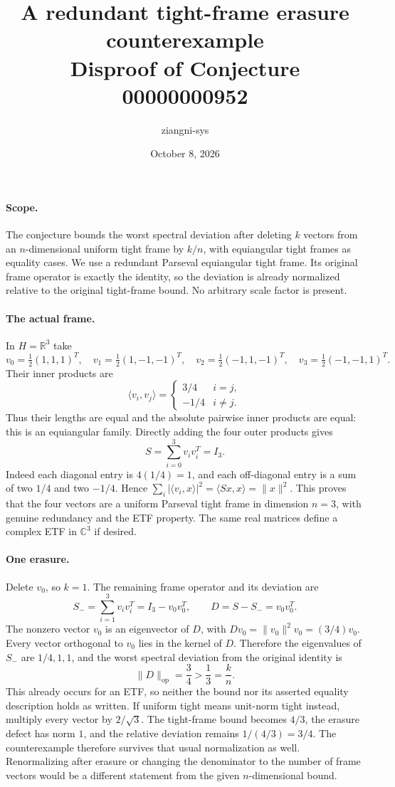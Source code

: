 \documentclass[11pt]{article}
\title{A redundant tight-frame erasure counterexample\\Disproof of Conjecture 00000000952}
\author{ziangni-sys}
\date{October 8, 2026}
\begin{document}
\maketitle
\paragraph{Scope.}
The conjecture bounds the worst spectral deviation after deleting $k$
vectors from an $n$-dimensional uniform tight frame by $k/n$, with
equiangular tight frames as equality cases. We use a redundant
Parseval equiangular tight frame. Its original frame operator is exactly
the identity, so the deviation is already normalized relative to the
original tight-frame bound. No arbitrary scale factor is present.

\paragraph{The actual frame.}
In $H=\mathbb R^3$ take
\[
 v_0=\tfrac12(1,1,1)^T,\quad
 v_1=\tfrac12(1,-1,-1)^T,\quad
 v_2=\tfrac12(-1,1,-1)^T,\quad
 v_3=\tfrac12(-1,-1,1)^T.
\]
Their inner products are
\[
 \langle v_i,v_j\rangle=
 \begin{cases}3/4&i=j,\\-1/4&i\ne j.\end{cases}
\]
Thus their lengths are equal and the absolute pairwise inner products
are equal: this is an equiangular family. Directly adding the four
outer products gives
\[
 S=\sum_{i=0}^3 v_i v_i^T=I_3.
\]
Indeed each diagonal entry is $4(1/4)=1$, and each off-diagonal entry
is a sum of two $1/4$ and two $-1/4$. Hence
$\sum_i|\langle v_i,x\rangle|^2=\langle Sx,x\rangle=\|x\|^2$.
This proves that the four vectors are a uniform Parseval tight frame
in dimension $n=3$, with genuine redundancy and the ETF property.
The same real matrices define a complex ETF in $\mathbb C^3$ if desired.

\paragraph{One erasure.}
Delete $v_0$, so $k=1$. The remaining frame operator and its deviation are
\[
 S_-=\sum_{i=1}^3v_iv_i^T=I_3-v_0v_0^T,
 \qquad D=S-S_-=v_0v_0^T.
\]
The nonzero vector $v_0$ is an eigenvector of $D$, with
$Dv_0=\|v_0\|^2v_0=(3/4)v_0$. Every vector orthogonal to $v_0$ lies
in the kernel of $D$. Therefore the eigenvalues of $S_-$ are
$1/4,1,1$, and the worst spectral deviation from the original
identity is
\[
 \|D\|_{\mathrm{op}}=\frac34>\frac13=\frac{k}{n}.
\]
This already occurs for an ETF, so neither the bound nor its asserted
equality description holds as written. If uniform tight means unit-norm
tight instead, multiply every vector by $2/\sqrt3$. The tight-frame
bound becomes $4/3$, the erasure defect has norm $1$, and the relative
deviation remains $1/(4/3)=3/4$. The counterexample therefore survives
that usual normalization as well. Renormalizing after erasure or changing
the denominator to the number of frame vectors would be a different
statement from the given $n$-dimensional bound.
\end{document}
